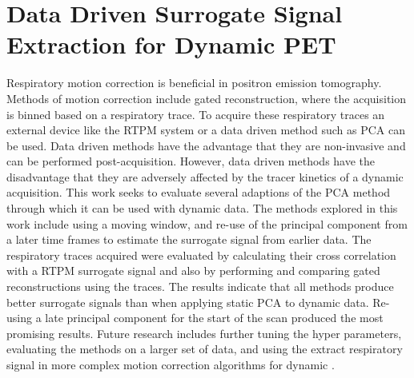 \chapter{Data Driven Surrogate Signal Extraction for Dynamic PET} \label{sec:data_driven_surrogate_signal_extraction_results}
    \newpage
    
        
    
        Respiratory motion correction is beneficial in positron emission tomography. Methods of motion correction include gated reconstruction, where the acquisition is binned based on a respiratory trace. To acquire these respiratory traces an external device like the \gls{RTPM} system or a data driven method such as \gls{PCA} can be used. Data driven methods have the advantage that they are non-invasive and can be performed post-acquisition. However, data driven methods have the disadvantage that they are adversely affected by the tracer kinetics of a dynamic acquisition. This work seeks to evaluate several adaptions of the \gls{PCA} method through which it  can be used with dynamic data. The methods explored in this work include using a moving window, and re-use of the principal component from a later time frames to estimate the surrogate signal from earlier data. The respiratory traces acquired were evaluated by calculating their cross correlation with a \gls{RTPM} surrogate signal and also by performing and comparing gated reconstructions using the traces. The results indicate that all methods produce better surrogate signals than when applying static \gls{PCA} to dynamic data. Re-using a late principal component for the start of the scan produced the most promising results. Future research includes further tuning the hyper parameters, evaluating the methods on a larger set of data, and using the extract respiratory signal in more complex motion correction algorithms for dynamic .
        
